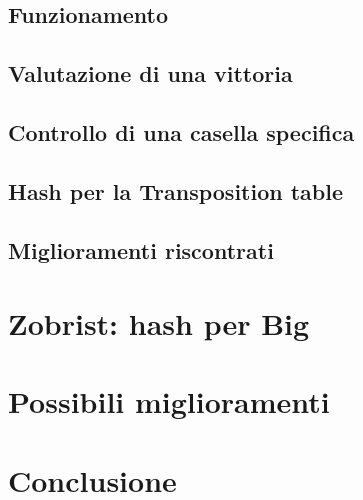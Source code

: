 \documentclass[a4paper]{article}
\begin{document}
\subsection{Funzionamento}
\subsection{Valutazione di una vittoria}
\subsection{Controllo di una casella specifica}
\subsection{Hash per la Transposition table}
\subsection{Miglioramenti riscontrati}

\section{Zobrist: hash per Big}

\section{Possibili miglioramenti}
\section{Conclusione}
\end{document}
